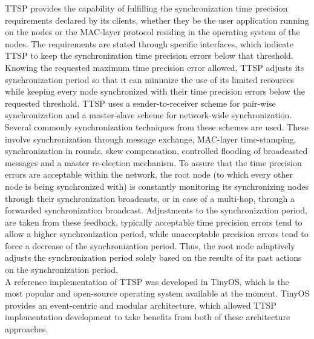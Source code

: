 TTSP provides the capability of fulfilling the synchronization time precision requirements declared by its clients, whether they be the user application running on the nodes or the MAC-layer protocol residing in the operating system of the nodes. The requirements are stated through specific interfaces, which indicate TTSP to keep the synchronization time precision errors below that threshold. Knowing the requested maximum time precision error allowed, TTSP adjusts its synchronization period so that it can minimize the use of its limited resources while keeping every node synchronized with their time precision errors below the requested threshold. TTSP uses a sender-to-receiver scheme for pair-wise synchronization and a master-slave scheme for network-wide synchronization. Several commonly synchronization techniques from these schemes are used. These involve synchronization through message exchange, MAC-layer time-stamping, synchronization in rounds, skew compensation, controlled flooding of broadcasted messages and a master re-election mechanism. To assure that the time precision errors are acceptable within the network, the root node (to which every other node is being synchronized with) is constantly monitoring its synchronizing nodes through their synchronization broadcasts, or in case of a multi-hop, through a forwarded synchronization broadcast. Adjustments to the synchronization period, are taken from these feedback, typically acceptable time precision errors tend to allow a higher synchronization period, while unacceptable precision errors tend to force a decrease of the synchronization period. Thus, the root node adaptively adjusts the synchronization period solely based on the results of its past actions on the synchronization period.\\ 

A reference implementation of TTSP was developed in TinyOS, which is the most popular and open-source operating system available at the moment. TinyOS provides an event-centric and modular architecture, which allowed TTSP implementation development to take benefits from both of these architecture approaches.\\

